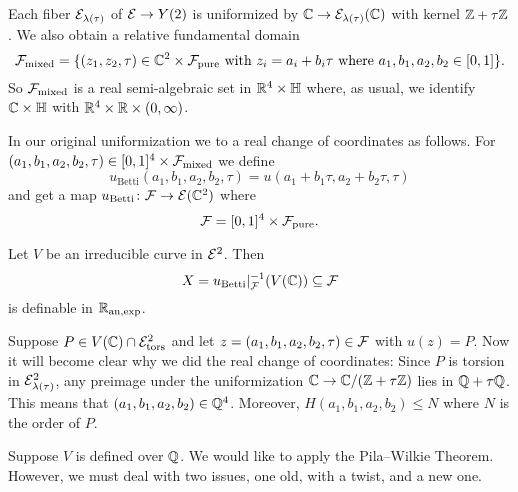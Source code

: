 Each fiber ${\mathcal E}_{\lambda(\tau)}$ of ${\mathcal E}\rightarrow Y(2)$ is
uniformized by ${\mathbb{C}}\rightarrow {\mathcal E}_{\lambda(\tau)}({\mathbb{C}})$ with kernel
${\mathbb{Z}}+\tau{\mathbb{Z}}$.
We also obtain a relative fundamental domain
\begin{equation*}
  {\mathcal F}_{\mathrm{mixed}} = \{(z_1,z_2,\tau) \in
  {\mathbb{C}}^2\times {\mathcal F}_{\mathrm{pure}} \text{ with }z_i=a_i+b_i\tau\text{
    where }a_1,b_1,a_2,b_2\in [0,1]  \}. 
\end{equation*}
So ${\mathcal F}_{\mathrm{mixed}}$
is a real semi-algebraic set in ${\mathbb{R}}^4\times {\mathbb{H}}$ where, as
usual, we identify ${\mathbb{C}}\times {\mathbb{H}}$ with ${\mathbb{R}}^4\times{\mathbb{R}}\times(0,\infty)$.

In our original uniformization we to a real change of coordinates as
follows. 
For $(a_1,b_1,a_2,b_2,\tau)\in [0,1]^4\times {\mathcal F}_{\mathrm{mixed}}$ we define
\begin{equation*}
   u_{\mathrm{Betti}}(a_1,b_1,a_2,b_2,\tau) = u(a_1+b_1\tau,a_2+b_2\tau,\tau)
\end{equation*}
and get a map $u_{\mathrm{Betti}}\colon{\mathcal F}\rightarrow{\mathcal E}({\mathbb{C}}^2)$
where
\begin{equation*}
  {\mathcal F} = [0,1]^4\times {\mathcal F}_{\mathrm{pure}}. 
\end{equation*}

Let $V$ be an irreducible curve in ${\mathcal E}^2$. Then
\begin{equation*}
  X = u_{\mathrm{Betti}}|_{{\mathcal F}}^{-1}(V({\mathbb{C}})) \subseteq {\mathcal F}
\end{equation*}
is definable in ${{\mathbb{R}}_{\mathrm{an,exp}}}$.


Suppose $P\in V({\mathbb{C}})\cap{\mathcal E}_{\mathrm{tors}}^2$ and let
$z=(a_1,b_1,a_2,b_2,\tau)\in {\mathcal F}$ with $u(z)=P$.
Now it will become clear why we did the real change of coordinates:
Since $P$ is torsion in ${\mathcal E}^2_{\lambda(\tau)}$, any preimage under
the
uniformization ${\mathbb{C}}\rightarrow {\mathbb{C}}/({\mathbb{Z}}+\tau{\mathbb{Z}})$ lies in
${\mathbb{Q}}+\tau{\mathbb{Q}}$. This means that $(a_1,b_1,a_2,b_2)\in {\mathbb{Q}}^4$. Moreover,
$H(a_1,b_1,a_2,b_2)\le N$ where $N$ is the order of $P$. 

Suppose $V$ is defined over ${\mathbb{Q}}$. 
We would like to apply the Pila--Wilkie Theorem. However, we must deal
with two issues, one old, with a twist, and a new one.

